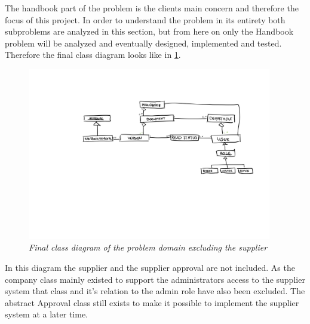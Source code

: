The handbook part of the problem is the clients main concern and therefore the focus of this project.
In order to understand the problem in its entirety both subproblems are analyzed in this section, but from here on  only the Handbook problem will be analyzed and eventually designed, implemented and tested.
Therefore the final class diagram looks like in \cref{fig:ClassDiagramNoSupplier}.

\begin{figure}[H]
	\centering
	\includegraphics[width=0.95\textwidth]{billeder/classDiagramNoSupplier.jpg}
	\caption{\textit{Final class diagram of the problem domain excluding the supplier
	}\label{fig:ClassDiagramNoSupplier}}
\end{figure}

In this diagram the supplier and the supplier approval are not included.
As the company class mainly existed to support the administrators access to the supplier system that class and it's relation to the admin role have also been excluded.
The abstract Approval class still exists to make it possible to implement the supplier system at a later time.